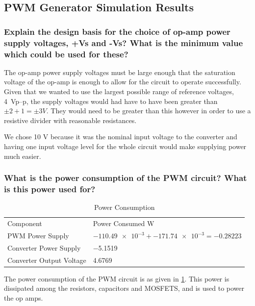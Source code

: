 \subsection{PWM Generator Simulation Results}
\subsubsection{Explain the design basis for the choice of op-amp power supply voltages, +Vs and -Vs? What is the minimum value which could be used for these?}
The op-amp power supply voltages must be large enough that the saturation voltage of the op-amp is enough to allow for the circuit to operate successfully. Given that we wanted to use the largest possible range of reference voltages, \SI{4}{\volt}p--p, the supply voltages would had have to have been greater than $\pm 2+1=\pm3 V$. They would need to be greater than this however in order to use a resistive divider with reasonable resistances.

We chose 10 V because it was the nominal input voltage to the converter and having one input voltage level for the whole circuit would make supplying power much easier.
\subsubsection{What is the power consumption of the PWM circuit? What is this power used for?}
\begin{table}[h]
	\centering
	\caption{Power Consumption}
	\begin{tabular}{ll}
		\toprule
		Component&Power Consumed \si{\watt}\\
		\cmidrule(r){1-1}\cmidrule(l){2-2}
		PWM Power Supply & $\num{-110.49e-3}+\num{-171.74e-3}=\num{-0.28223}$\\
		Converter Power Supply & \num{-5.1519}\\
		Converter Output Voltage & \num{4.6769}\\
		\bottomrule
	\end{tabular}
	\label{tab:pwm power}
\end{table}
The power consumption of the PWM circuit is as given in \cref{tab:pwm power}. This power is dissipated among the resistors, capacitors and MOSFETS, and is used to power the op amps.
